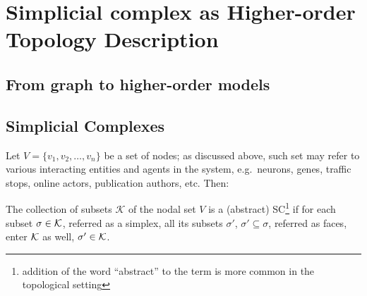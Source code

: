 \chapter{ Simplicial complex as Higher-order Topology Description } \label{chap:SC}




\section{ From graph to higher-order models } \label{sec:higher-order-models}


















\section{ Simplicial Complexes } \label{sec:SCs}


Let \( V = \{ v_1, v_2, \ldots, v_n \} \) be a set of nodes; as discussed above, such set may refer to various interacting entities and agents in the system, e.g.\ neurons, genes, traffic stops, online actors, publication authors, etc. Then: 

\begin{definition}\label{def:simplicial_complex}
      The collection of subsets \( \mathcal K \) of the nodal set \( V \) is  a (abstract) {SC}\footnote{addition of the word ``abstract'' to the term is more common in the topological setting} if for each subset \( \sigma \in \mathcal{K} \), referred as a {simplex}, all its subsets \( \sigma'\), \( \sigma' \subseteq \sigma \), referred as {faces}, enter \( \mathcal{K} \) as well, \( \sigma' \in \mathcal{K}\).
\end{definition}


